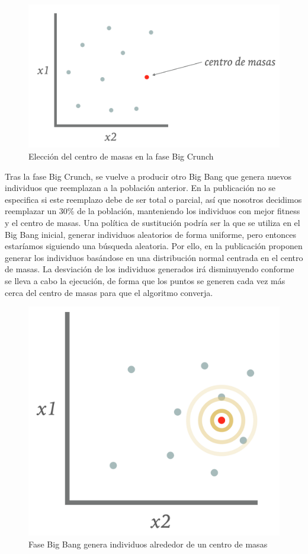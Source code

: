 \begin{figure}[H]
\centering
    \includegraphics[scale=0.28]{img/big_crunch.png}
    \caption{Elección del centro de masas en la fase Big Crunch}
\end{figure}

Tras la fase Big Crunch, se vuelve a producir otro Big Bang que genera nuevos individuos que reemplazan a la población anterior. En la publicación no se especifica si este reemplazo debe de ser total o parcial, así que nosotros decidimos reemplazar un 30\% de la población, manteniendo los individuos con mejor fitness y el centro de masas. Una política de sustitución podría ser la que se utiliza en el Big Bang inicial, generar individuos aleatorios de forma uniforme, pero entonces estaríamos siguiendo una búsqueda aleatoria. Por ello, en la publicación proponen generar los individuos basándose en una distribución normal centrada en el centro de masas. La desviación de los individuos generados irá disminuyendo conforme se lleva a cabo la ejecución, de forma que los puntos se generen cada vez más cerca del centro de masas para que el algoritmo converja. 

\begin{figure}[H]
    \centering
        \includegraphics[scale=0.28]{img/big_bang.png}
        \caption{Fase Big Bang genera individuos alrededor de un centro de masas}
    \end{figure}

